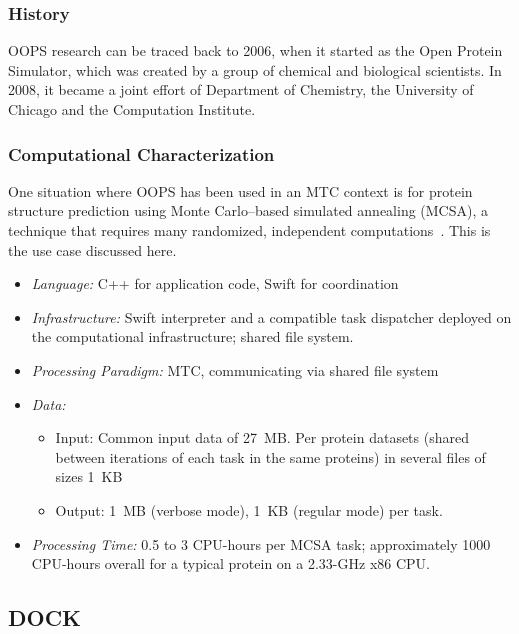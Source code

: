 \documentclass[10pt,letterpaper]{article}
\begin{document}
\subsubsection{History}
OOPS research can be traced back to 2006, when it started
as the Open Protein Simulator, which was
created by a group of chemical and biological scientists. In 2008, it became
a joint effort of Department of Chemistry, the University of Chicago and the Computation
Institute. 

\subsubsection{Computational Characterization}
One situation where OOPS has been used in an MTC context is for protein structure prediction
using Monte Carlo--based simulated annealing (MCSA), a technique that
requires many randomized,
independent computations~\cite{hocky-oops-09}.  This is the
use case discussed here.
\begin {itemize}
\item {\em Language:} C++ for application code, Swift for coordination
\item {\em Infrastructure:} Swift interpreter and a compatible 
        task dispatcher deployed on the computational infrastructure;  
        shared file system.
\item {\em Processing Paradigm:} MTC, communicating via shared file system
\item {\em Data:} \begin{itemize}
    \item   Input: Common input data of 27~MB.  Per protein datasets (shared between iterations
                    of each task in the same proteins) in several files of sizes 1~KB
    \item Output: 1~MB (verbose mode), 1~KB (regular mode) per task. 
    \end{itemize}
\item {\em Processing Time:} 0.5 to 3 CPU-hours per MCSA task; approximately 1000 CPU-hours overall for a typical protein on a 2.33-GHz x86 CPU.

\end{itemize}

\subsection{DOCK\label{sec:app:dock}}
\end{document}
